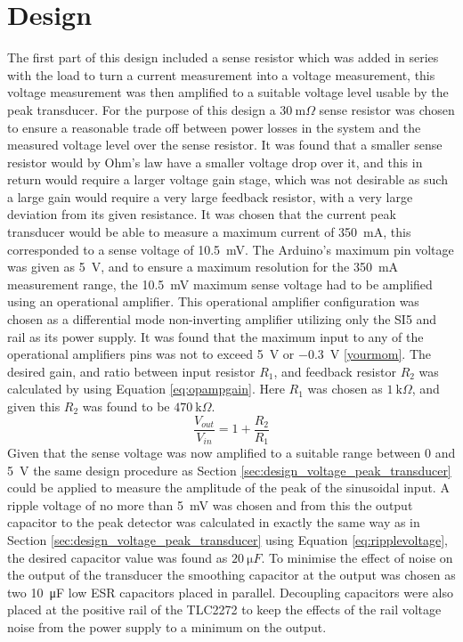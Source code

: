 \section{Design} \label{sec:design_current_peak_transducer}
The first part of this design included a sense resistor which was added in series with the load to turn a current measurement into a voltage measurement, this voltage measurement was then amplified to a suitable voltage level usable by the peak transducer. For the purpose of this design a $\SI{30}{\milli \Omega}$ sense resistor was chosen to ensure a reasonable trade off between power losses in the system and the measured voltage level over the sense resistor. It was found that a smaller sense resistor would by Ohm's law have a smaller voltage drop over it, and this in return would require a larger voltage gain stage, which was not desirable as such a large gain would require a very large feedback resistor, with a very large deviation from its given resistance. It was chosen that the current peak transducer would be able to measure a maximum current of \SI{350}{\milli A}, this corresponded to a sense voltage of \SI{10.5}{\milli V}.\newline
The Arduino's maximum pin voltage was given as \SI{5}{\volt}, and to ensure a maximum resolution for the \SI{350}{\milli A} measurement range, the \SI{10.5}{\milli V} maximum sense voltage had to be amplified using an operational amplifier. This operational amplifier configuration was chosen as a differential mode non-inverting amplifier utilizing only the SI{5}{\volt} and rail as its power supply. It was found that the maximum input to any of the operational amplifiers pins was not to exceed \SI{5}{\volt} or \SI{-0.3}{\volt} \ref{yourmom}.
The desired gain, and ratio between input resistor $R_1$, and feedback resistor $R_2$ was calculated by using Equation \ref{eq:opampgain}. Here $R_1$ was chosen as $\SI{1}{\kilo \Omega}$, and given this $R_2$ was found to be $\SI{470}{\kilo \Omega}$.\newline
\begin{equation}
   \frac{V_{out}}{V_{in}}=1+\frac{R_2}{R_1} 
   \label{eq:opampgain}
\end{equation}
Given that the sense voltage was now amplified to a suitable range between 0 and \SI{5}{\volt} the same design procedure as Section \ref{sec:design_voltage_peak_transducer} could be applied to measure the amplitude of the peak of the sinusoidal input. A ripple voltage of no more than \SI{5}{\milli \volt} was chosen and from this the output capacitor to the peak detector was calculated in exactly the same way as in Section \ref{sec:design_voltage_peak_transducer} using Equation \ref{eq:ripplevoltage}, the desired capacitor value was found as $\SI{20}{\micro F}$. To minimise the effect of noise on the output of the transducer the smoothing capacitor at the output was chosen as two \SI{10}{\micro F} low ESR capacitors placed in parallel. Decoupling capacitors were also placed at the positive rail of the TLC2272 to keep the effects of the rail voltage noise from the power supply to a minimum on the output.
